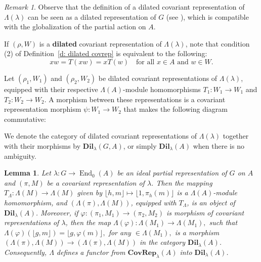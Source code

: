 \documentclass[11pt]{amsart}
\numberwithin{equation}{section}
\newtheorem{lemma}[theorem]{Lemma}
\theoremstyle{definition}
\theoremstyle{remark}
\newtheorem{remark}[theorem]{Remark}
\begin{document}
    \begin{remark}
        Observe that the definition of a dilated covariant representation of  \( \Lambda (\lambda ) \)   can be seen as a dilated representation of \(G\) (see \cite{Article_Alves-Batista-Vercruysse_2019_DOPROHA}), which is compatible with the globalization of the partial action on \(A\).
    \end{remark}


If \((\rho, W)\) is a \textbf{dilated} covariant representation of \(\Lambda(\lambda)\), note that condition (2) of Definition~\ref{d: dilated covrep} is equivalent to the following:  
\begin{equation}\label{eq xw}
    xw = T(xw) = xT(w) \quad \text{for all } x \in A \text{ and } w \in W.
\end{equation}

 Let \((\rho_1, W_1)\) and \((\rho_2, W_2)\) be dilated covariant representations of  \( \Lambda (\lambda ) \), equipped with their respective \(\Lambda(A)\)-module homomorphisms \(T_1: W_1 \to W_1\) and \(T_2: W_2 \to W_2\).
A morphism between these representations is a covariant representation morphism \(\psi: W_1 \to W_2\) that makes the following diagram  commutative:

\begin{center}
\end{center}

We denote the category of dilated covariant representations of   \(\Lambda( \lambda )\) together with their morphisms by \(\textbf{Dil}_{\lambda}(G, A)\), or simply  \(\textbf{Dil}_{\lambda}(A)\) when there is no ambiguity. 


\begin{lemma}\label{l: T for Lambda M}
    Let \(\lambda: G \to \operatorname{End}_0(A)\) be  an ideal partial representation  of \( G \) on \(A\) and \((\pi, M)\) be a covariant representation of \(\lambda\). Then the mapping \( T_\Lambda: \Lambda(M) \to \Lambda(M) \) given by \( \lfloor h, m \rfloor \mapsto \lfloor 1, \pi_h(m) \rfloor \) is a \(\Lambda(A)\)-module homomorphism, and \((\Lambda(\pi), \Lambda(M))\), equipped with \( T_\Lambda \), is an object of   \(\textbf{Dil}_{\lambda}(A)\). Moreover, if 
    $\varphi : (\pi _1, M_1) \to  (\pi _2, M_2) $ is morphism of covariant representations of \(\lambda\), then the map $\Lambda (\varphi ) : \Lambda (M_1) \to \Lambda (M_1),$ such that $\Lambda (\varphi )(\lfloor g,m \rfloor )= \lfloor g, \varphi (m) \rfloor,$
    for any $\in \Lambda (M_1),$ is a morphism 
    \((\Lambda(\pi), \Lambda(M)) \to (\Lambda(\pi), \Lambda(M))\) in the category \(\textbf{Dil}_{\lambda}(A)\).  Consequently, \(\Lambda\) defines a functor from  \(\textbf{CovRep}_{\lambda} (A)\) into \(\textbf{Dil}_{\lambda}(A)\).
\end{lemma}
\end{document}
